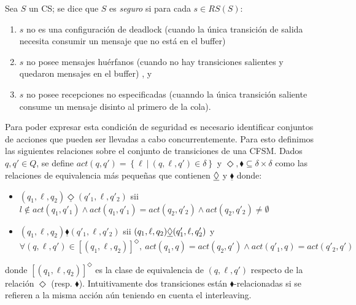 \begin{definition} Sea $S$ un CS; se dice que $S$ es \emph{seguro} si para cada $s \in RS(S)$:
\begin{enumerate}
\item $s$ no es una configuración de deadlock (cuando la única transición de salida necesita consumir un mensaje que no está en el buffer)
\item $s$ no posee mensajes huérfanos (cuando no hay transiciones salientes y quedaron mensajes en el buffer) , y
\item $s$ no posee recepciones no especificadas (cuanndo la única transición saliente consume un mensaje disinto al primero de la cola).
\end{enumerate}
Para poder expresar esta condición de seguridad es necesario identificar conjuntos de acciones que pueden ser llevadas a cabo concurrentemente. Para esto definimos las siguientes relaciones sobre el conjunto de transiciones de una CFSM. Dados $q, q' \in Q$, se define $\mathit{act}(q,q') = \left\{\ell \ \left|\right. \ (q,\ell,q') \in \delta \right\}$ y $\Diamond, \blacklozenge \subseteq \delta \times \delta$ como las relaciones de equivalencia más pequeñas que contienen $\underline{\Diamond}$ y $\underline{\blacklozenge}$ donde:
\begin{itemize}
\item $(q_1, \ell, q_2) \underline{\Diamond} (q'_1, \ell, q'_2)$ sii $ l \notin \mathit{act}(q_1, q'_1) \land \mathit{act}(q_1, q'_1) = \mathit{act}(q_2, q'_2) \land \mathit{act}(q_2, q'_2) \neq \emptyset $
\item  $(q_1, \ell, q_2) \underline{\blacklozenge} (q'_1, \ell, q'_2)$ sii $ (q_1, \ell, q_2) \underline{\Diamond} (q'_1, \ell, q'_2) $ y $\forall(q,\ell,q') \in [(q_1, \ell, q_2) ]^{\Diamond}, \ \mathit{act}(q_1,q) = \mathit{act}(q_2,q') \land \mathit{act}(q'_1,q) = \mathit{act}(q'_2,q')$  
\end{itemize}
donde $[(q_1, \ell, q_2) ]^{\Diamond}$ es la clase de equivalencia de $(q, \ell, q')$ respecto de la relación $\Diamond$ (resp. $\blacklozenge$). Intuitivamente dos transiciones están $\blacklozenge$-relacionadas si se refieren a la misma acción aún teniendo en cuenta el interleaving.
\end{definition}

